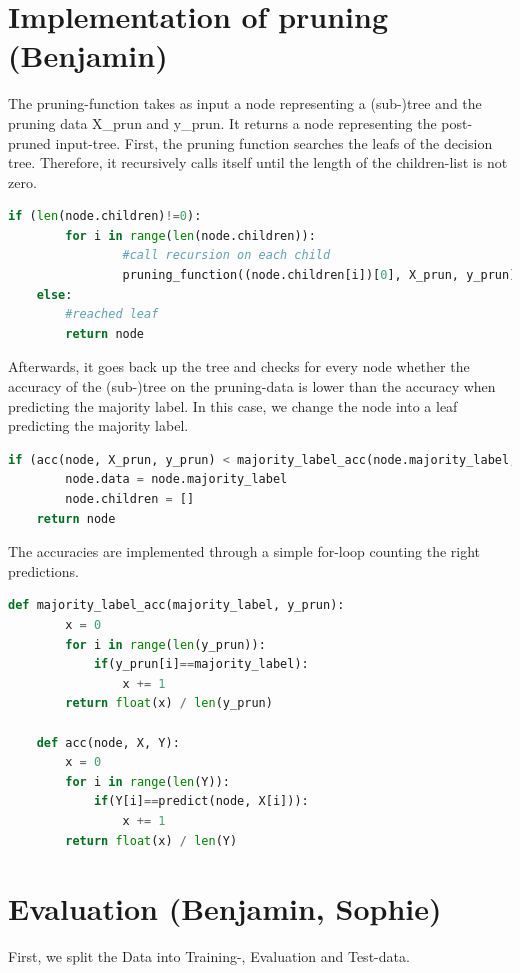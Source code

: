 \documentclass[12pt,a4paper]{scrartcl}		%
\begin{document}
\section{Implementation of pruning (Benjamin)}
The pruning-function takes as input a node representing a (sub-)tree and the pruning data X\_prun and y\_prun. 
It returns a node representing the post-pruned input-tree. 
First, the pruning function searches the leafs of the decision tree. Therefore, it recursively calls itself 
until the length of the children-list is not zero. 

\begin{lstlisting}[language=Python]
    if (len(node.children)!=0):  
        for i in range(len(node.children)):
                #call recursion on each child
                pruning_function((node.children[i])[0], X_prun, y_prun) 
    else:
        #reached leaf
        return node
\end{lstlisting}

Afterwards, it goes back up the tree and checks for every node whether the accuracy of the (sub-)tree on the 
pruning-data is lower than the accuracy when predicting the majority label. 
In this case, we change the node into a leaf predicting the majority label. 

\begin{lstlisting}[language=Python]
    if (acc(node, X_prun, y_prun) < majority_label_acc(node.majority_label, y_prun)):
        node.data = node.majority_label
        node.children = []
    return node
\end{lstlisting}

The accuracies are implemented through a simple for-loop counting the right predictions. 

\begin{lstlisting}[language=Python]
    def majority_label_acc(majority_label, y_prun):
        x = 0
        for i in range(len(y_prun)):
            if(y_prun[i]==majority_label):
                x += 1
        return float(x) / len(y_prun)

    def acc(node, X, Y):
        x = 0
        for i in range(len(Y)):
            if(Y[i]==predict(node, X[i])):
                x += 1
        return float(x) / len(Y)
\end{lstlisting}

\section{Evaluation (Benjamin, Sophie)}
First, we split the Data into Training-, Evaluation and Test-data. 
\end{document}
